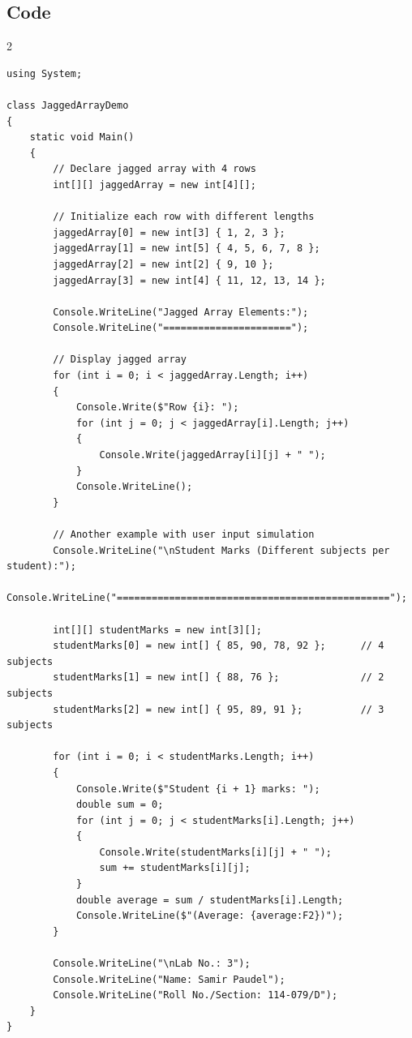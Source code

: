 \documentclass[10pt,a4paper]{article}
\begin{document}
\subsection*{Code}
\begin{multicols}{2}
\begin{lstlisting}
using System;

class JaggedArrayDemo
{
    static void Main()
    {
        // Declare jagged array with 4 rows
        int[][] jaggedArray = new int[4][];
        
        // Initialize each row with different lengths
        jaggedArray[0] = new int[3] { 1, 2, 3 };
        jaggedArray[1] = new int[5] { 4, 5, 6, 7, 8 };
        jaggedArray[2] = new int[2] { 9, 10 };
        jaggedArray[3] = new int[4] { 11, 12, 13, 14 };
        
        Console.WriteLine("Jagged Array Elements:");
        Console.WriteLine("======================");
        
        // Display jagged array
        for (int i = 0; i < jaggedArray.Length; i++)
        {
            Console.Write($"Row {i}: ");
            for (int j = 0; j < jaggedArray[i].Length; j++)
            {
                Console.Write(jaggedArray[i][j] + " ");
            }
            Console.WriteLine();
        }
        
        // Another example with user input simulation
        Console.WriteLine("\nStudent Marks (Different subjects per student):");
        Console.WriteLine("===============================================");
        
        int[][] studentMarks = new int[3][];
        studentMarks[0] = new int[] { 85, 90, 78, 92 };      // 4 subjects
        studentMarks[1] = new int[] { 88, 76 };              // 2 subjects
        studentMarks[2] = new int[] { 95, 89, 91 };          // 3 subjects
        
        for (int i = 0; i < studentMarks.Length; i++)
        {
            Console.Write($"Student {i + 1} marks: ");
            double sum = 0;
            for (int j = 0; j < studentMarks[i].Length; j++)
            {
                Console.Write(studentMarks[i][j] + " ");
                sum += studentMarks[i][j];
            }
            double average = sum / studentMarks[i].Length;
            Console.WriteLine($"(Average: {average:F2})");
        }
        
        Console.WriteLine("\nLab No.: 3");
        Console.WriteLine("Name: Samir Paudel");
        Console.WriteLine("Roll No./Section: 114-079/D");
    }
}
\end{lstlisting}
\end{multicols}
\end{document}
